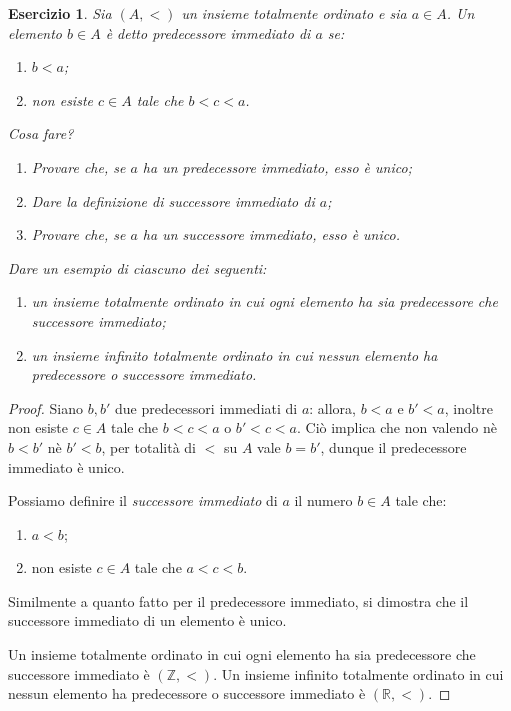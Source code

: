 \documentclass[fontsize = 11 pt, paper=A4, oneside, index=totoc, hyperref]{article}
\theoremstyle{definition}
\theoremstyle{plain}
\newtheorem{exe}{Esercizio}[section]
\begin{document}
\begin{exe}
  Sia \((A,<)\) un insieme totalmente ordinato e sia \(a \in A\). Un elemento \(b \in A\) è detto \emph{predecessore immediato} di \(a\) se:
  \begin{enumerate}
    \item \(b < a\);
    \item non esiste \(c \in A\) tale che \(b < c < a\).
  \end{enumerate}
  Cosa fare?
  \begin{enumerate}
    \item Provare che, se \(a\) ha un predecessore immediato, esso è unico;
    \item Dare la definizione di \emph{successore immediato} di \(a\);
    \item Provare che, se \(a\) ha un successore immediato, esso è unico.
  \end{enumerate}
  Dare un esempio di ciascuno dei seguenti:
  \begin{enumerate}
    \item un insieme totalmente ordinato in cui ogni elemento ha sia predecessore che successore immediato;
    \item un insieme infinito totalmente ordinato in cui nessun elemento ha predecessore o successore immediato.
  \end{enumerate}
\end{exe}
\begin{proof}
  Siano \(b,b'\) due predecessori immediati di \(a\): allora, \(b < a\) e \(b' < a\), inoltre non esiste \(c \in A\) tale che \(b < c < a\) o \(b' < c < a\). Ciò implica che non valendo nè \(b < b'\) nè \(b' < b\), per totalità di \(<\) su \(A\) vale \(b = b'\), dunque il predecessore immediato è unico.

  Possiamo definire il \emph{successore immediato} di \(a\) il numero \(b \in A\) tale che:
  \begin{enumerate}
    \item \(a < b\);
    \item non esiste \(c \in A\) tale che \(a < c < b\).
  \end{enumerate}
  Similmente a quanto fatto per il predecessore immediato, si dimostra che il successore immediato di un elemento è unico.

  Un insieme totalmente ordinato in cui ogni elemento ha sia predecessore che successore immediato è \((\mathbb{Z},<)\). Un insieme infinito totalmente ordinato in cui nessun elemento ha predecessore o successore immediato è \((\mathbb{R},<)\).
\end{proof}
\end{document}
